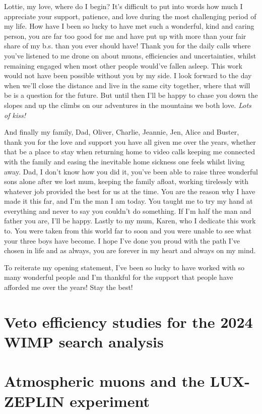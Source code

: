 \documentclass[a4paper,11pt,usegeometry]{scrreprt} %
\begin{document}
Lottie, my love, where do I begin? It's difficult to put into words how much I appreciate your support, patience, and love during the most challenging period of my life. How have I been so lucky to have met such a wonderful, kind and caring person, you are far too good for me and have put up with more than your fair share of my b.s. than you ever should have! Thank you for the daily calls where you've listened to me drone on about muons, efficiencies and uncertainties, whilst remaining engaged when most other people would've fallen asleep. This work would not have been possible without you by my side. I look forward to the day when we'll close the distance and live in the same city together, where that will be is a question for the future. But until then I'll be happy to chase you down the slopes and up the climbs on our adventures in the mountains we both love. \textit{Lots of kiss!}

And finally my family, Dad, Oliver, Charlie, Jeannie, Jen, Alice and Buster, thank you for the love and support you have all given me over the years, whether that be a place to stay when returning home to video calls keeping me connected with the family and easing the inevitable home sickness one feels whilst living away. Dad, I don't know how you did it, you've been able to raise three wonderful sons alone after we lost mum, keeping the family afloat, working tirelessly with whatever job provided the best for us at the time. You are the reason why I have made it this far, and I'm the man I am today. You taught me to try my hand at everything and never to say you couldn't do something. If I'm half the man and father you are, I'll be happy. Lastly to my mum, Karen, who I dedicate this work to. You were taken from this world far to soon and you were unable to see what your three boys have become. I hope I've done you proud with the path I've chosen in life and as always, you are forever in my heart and always on my mind.

To reiterate my opening statement, I've been so lucky to have worked with so many wonderful people and I'm thankful for the support that people have afforded me over the years! Stay the best!

\singlespacing
\tableofcontents
\listoffigures	%
\listoftables  %
\clearpage
{}
\doublespacing %








\printbibliography[heading=bibintoc,title={Bibliography}]
\appendix
\chapter{Veto efficiency studies for the 2024 WIMP search analysis}\label{app:VetoEff}

\chapter{Atmospheric muons and the LUX-ZEPLIN experiment}\label{app:Muons}

\end{document}
